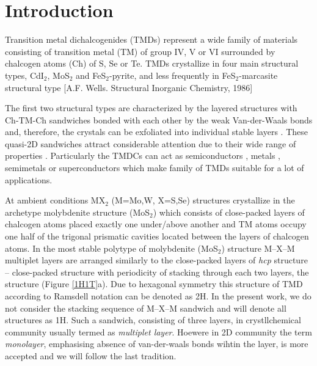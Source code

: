 \documentclass[a4paperm]{article}
\begin{document}
\section{Introduction}

Transition metal dichalcogenides (TMDs) represent a wide family of materials consisting of transition metal (TM) of group IV, V or VI surrounded by chalcogen atoms (Ch) of S, Se or Te. 
TMDs crystallize in four main structural types, CdI$_2$, MoS$_2$ and FeS$_2$-pyrite, and less frequently in FeS$_2$-marcasite structural type \cite{wells1986_book} [A.F. Wells. Structural Inorganic Chemistry, 1986]

The first two structural types are characterized by the layered structures with Ch-TM-Ch sandwiches bonded with each other by the weak Van-der-Waals bonds and, therefore, the crystals can be exfoliated into individual stable layers \cite{zhang2020intercalation}. These quasi-2D sandwiches attract considerable attention due to their wide range of properties \cite{li2017graphene, SHI20181, xi2016ising, hu2019recent, pi2019recent}. 
Particularly the TMDCs can act as semiconductors \cite{nayeri2018transport}, metals \cite{zhao20212d}, semimetals \cite{xu2020high, zhao2020observation} or superconductors \cite{wang2020nodeless,hsu2017topological} which make family of TMDs suitable for a lot of applications. 

At ambient conditions MX$_2$ (M=Mo,W, X=S,Se) structures crystallize in the archetype molybdenite structure (MoS$_2$) which consists of close-packed layers of chalcogen atoms placed exactly one under/above another and TM atoms occupy one half of the  trigonal prismatic cavities located between the layers of chalcogen atoms. 
In the most stable polytype of molybdenite (MoS$_2$) structure M--X--M multiplet layers are arranged similarly to the close-packed layers of {\it hcp} structure -- close-packed structure with periodicity of stacking through each two layers, the structure (Figure \ref{1H1T}a).
Due to hexagonal symmetry this structure of TMD according to Ramsdell notation can be denoted as 2H.
In the present work, we do not consider the stacking sequence of M--X--M sandwich and will denote all structures as 1H.
Such a sandwich, consisting of three layers, in crystllchemical community usually termed as {\it multiplet layer}.
Hoewere in 2D community the term {\it monolayer}, emphasising absence of van-der-waals bonds wihtin the layer, is more accepted and we will follow the last tradition. 
\end{document}

